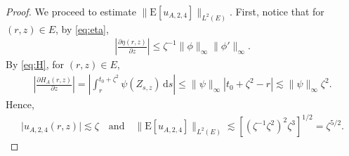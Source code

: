 \documentclass[12pt,a4paper]{article}
\newcommand{\E}{\mathrm{E}}
\renewcommand{\d}{\mathrm{d}}
\newcommand {\deltah}{{\zeta}}
\newcommand{\<}{\langle}
\renewcommand{\>}{\rangle}
\begin{document}
\begin{proof}
We proceed to estimate $\|\E[u_{A,2,4}]\|_{L^2(E)}$. First, notice that for $(r,z)\in E$, by \eqref{eq:eta}, 
           \begin{align}\label{eq:eta3}
           \left|\frac{\partial \eta(r,z)}{\partial z}\right| \leq \deltah^{-1}\|\phi\|_{\infty}\|\phi'\|_{\infty}.
           \end{align}
By \eqref{eq:H}, for $(r,z)\in E$,
           \begin{align}\label{eq:HA3}
           \left|\frac{\partial H_A(r,z)}{\partial z} \right|= \left|\int_r^{t_0+\deltah^2}\psi(Z_{s, z})\, \d s\right|
            \leq \|\psi\|_{\infty}|t_0+\deltah^2-r| \lesssim \|\psi\|_{\infty}\deltah^2.
           \end{align}
           Hence,
\begin{align}\label{eq:u4}
      \vert u_{A,2,4}(r, z) \vert \lesssim  \zeta \quad\text{and}\quad       \|\E[u_{A,2,4}]\|_{L^2(E)}\lesssim  [(\deltah^{-1}\deltah^{2})^2\deltah^3]^{1/2}=\deltah^{5/2}.
\end{align}
           

\end{proof}
\end{document}
